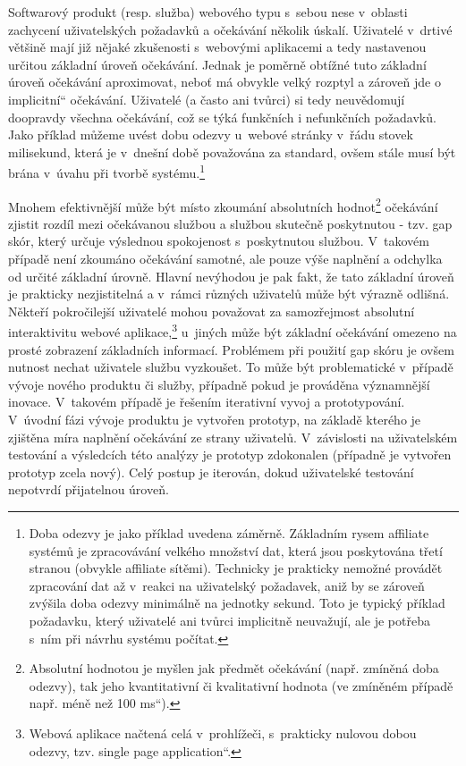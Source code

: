 \documentclass[12pt,oneside,openany]{fithesis}
\begin{document}
Softwarový produkt (resp. služba) webového typu s~sebou nese v~oblasti 
zachycení uživatelských požadavků a očekávání několik úskalí. 
Uživatelé v~drtivé většině mají již nějaké zkušenosti s~webovými 
aplikacemi a tedy nastavenou určitou základní úroveň očekávání. Jednak 
je poměrně obtížné tuto základní úroveň očekávání aproximovat, 
neboť má obvykle velký rozptyl a zároveň jde o~\glqq 
implicitní\textquotedblleft{} očekávání. Uživatelé (a často ani 
tvůrci) si tedy neuvědomují doopravdy všechna očekávání, což se týká 
funkčních i nefunkčních požadavků. Jako příklad můžeme uvést dobu 
odezvy u~webové stránky v~řádu stovek milisekund, která je v~dnešní 
době považována za standard, ovšem stále musí být brána v~úvahu při 
tvorbě systému.\footnote{
    Doba odezvy je jako příklad uvedena záměrně. Základním rysem 
affiliate systémů je zpracovávání velkého množství dat, která jsou 
poskytována třetí stranou (obvykle affiliate sítěmi). Technicky je 
prakticky nemožné provádět zpracování dat až v~reakci na uživatelský 
požadavek, aniž by se zároveň zvýšila doba odezvy minimálně na jednotky 
sekund. Toto je typický příklad požadavku, který uživatelé ani tvůrci 
implicitně neuvažují, ale je potřeba s~ním při návrhu systému počítat.}

Mnohem efektivnější může být místo zkoumání absolutních 
hodnot\footnote{
    Absolutní hodnotou je myšlen jak předmět očekávání (např. 
zmíněná doba odezvy), tak jeho kvantitativní či kvalitativní hodnota (ve 
zmíněném případě např. \glqq méně než 100 ms\textquotedblleft{}).}
očekávání zjistit 
rozdíl mezi očekávanou službou a službou skutečně poskytnutou - tzv. gap 
skór, který určuje výslednou spokojenost s~poskytnutou službou. 
\cite{spokojenost-lukasova}{} V~takovém případě není zkoumáno 
očekávání samotné, ale pouze výše naplnění a odchylka od určité 
základní úrovně. Hlavní nevýhodou je pak fakt, že tato základní 
úroveň je prakticky nezjistitelná a v~rámci různých uživatelů může 
být výrazně odlišná. Někteří pokročilejší uživatelé mohou 
považovat za samozřejmost absolutní interaktivitu webové 
aplikace,\footnote{
    Webová aplikace načtená celá v~prohlížeči, s~prakticky nulovou dobou 
odezvy, tzv. \glqq single page application\textquotedblleft{}.}
u~jiných může být 
základní očekávání omezeno na prosté zobrazení základních informací. 
Problémem při použití gap skóru je ovšem nutnost nechat uživatele 
službu vyzkoušet. To může být problematické v~případě vývoje nového 
produktu či služby, případně pokud je prováděna významnější inovace. 
V~takovém případě je řešením iterativní vyvoj a prototypování. 
V~úvodní fázi vývoje produktu je vytvořen prototyp, na základě kterého 
je zjištěna míra naplnění očekávání ze strany uživatelů. 
V~závislosti na uživatelském testování a výsledcích této analýzy je 
prototyp zdokonalen (případně je vytvořen prototyp zcela nový). Celý 
postup je iterován, dokud uživatelské testování nepotvrdí přijatelnou 
úroveň.
\end{document}
